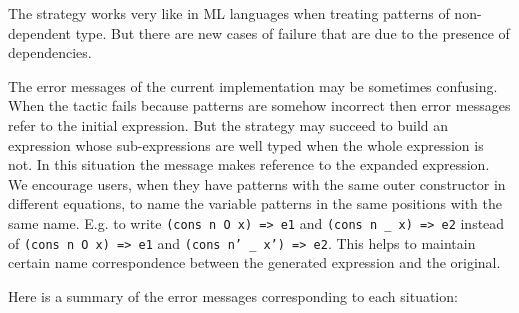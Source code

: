 \label{limitations}
The strategy works very like in ML languages when treating
patterns of non-dependent type.  
But there are new cases of failure that are due to the presence of 
dependencies. 

The error messages of the current implementation may be sometimes
confusing.  When the tactic fails because patterns are somehow
incorrect then error messages refer to the initial expression. But the
strategy may succeed to build an expression whose sub-expressions are
well typed when the whole expression is not. In this situation the
message makes reference to the expanded expression.  We encourage
users, when they have patterns with the same outer constructor in
different equations, to name the variable patterns in the same
positions with the same name.  
E.g. to write {\small\texttt{(cons n O x) => e1}} 
and {\small\texttt{(cons n \_ x) => e2}} instead of
{\small\texttt{(cons n O x) => e1}} and 
{\small\texttt{(cons n' \_ x') => e2}}. 
This helps to maintain certain name correspondence between the
generated expression and the original.

Here is a summary of the error messages corresponding to each situation:


